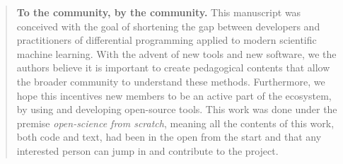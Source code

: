 
\begin{quote}
    \textbf{To the community, by the community. }
    This manuscript was conceived with the goal of shortening the gap between developers and practitioners of differential programming applied to  modern scientific machine learning. 
    With the advent of new tools and new software, we the authors believe it is important to create pedagogical contents that allow the broader community to understand these methods. 
    Furthermore, we hope this incentives new members to be an active part of the ecosystem, by using and developing open-source tools. 
    This work was done under the premise \textit{open-science from scratch}, meaning all the contents of this work, both code and text, had been in the open from the start and that any interested person can jump in and contribute to the project. 
\end{quote}
